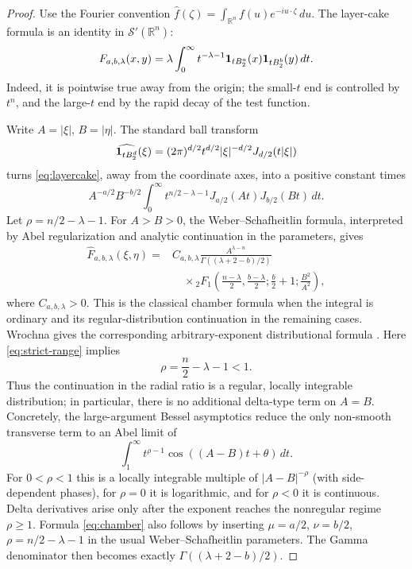 \documentclass[11pt]{article}
\theoremstyle{remark}
\newcommand{\R}{\mathbb R}
\newcommand{\Sclass}{\mathcal S}
\begin{document}
\begin{proof}
Use the Fourier convention
$\widehat f(\zeta)=\int_{\R^n}f(u)e^{-iu\cdot\zeta}\,du$.
The layer-cake formula is an identity in $\Sclass'(\R^n)$:
\begin{equation}\label{eq:layercake}
F_{a,b,\lambda}(x,y)=\lambda\int_0^\infty
t^{-\lambda-1}{\bf1}_{tB_2^a}(x){\bf1}_{tB_2^b}(y)\,dt.
\end{equation}
Indeed, it is pointwise true away from the origin; the small-$t$ end is
controlled by $t^n$, and the large-$t$ end by the rapid decay of the test
function.

Write $A=|\xi|$, $B=|\eta|$.  The standard ball transform
\[
\widehat{{\bf1}_{tB_2^d}}(\xi)
=(2\pi)^{d/2}t^{d/2}|\xi|^{-d/2}J_{d/2}(t|\xi|)
\]
turns \eqref{eq:layercake}, away from the coordinate axes, into a positive
constant times
\begin{equation}\label{eq:bessel}
A^{-a/2}B^{-b/2}\int_0^\infty
t^{n/2-\lambda-1}J_{a/2}(At)J_{b/2}(Bt)\,dt.
\end{equation}
Let $\rho=n/2-\lambda-1$.  For $A>B>0$, the
Weber--Schafheitlin formula, interpreted by Abel regularization and analytic
continuation in the parameters, gives
\begin{align}
\widehat F_{a,b,\lambda}(\xi,\eta)
={}&C_{a,b,\lambda}
\frac{A^{\lambda-n}}{\Gamma((\lambda+2-b)/2)} \label{eq:chamber}\\
&\quad\times{}_2F_1\left(
\frac{n-\lambda}{2},\frac{b-\lambda}{2};
\frac b2+1;\frac{B^2}{A^2}\right),\nonumber
\end{align}
where $C_{a,b,\lambda}>0$.  This is the classical chamber formula when
the integral is ordinary and its regular-distribution continuation in the
remaining cases.  Wrochna gives the corresponding arbitrary-exponent
distributional formula \cite{Wrochna}.  Here \eqref{eq:strict-range} implies
\[
\rho=\frac n2-\lambda-1<1.
\]
Thus the continuation in the radial ratio is a regular, locally integrable
distribution; in particular, there is no additional delta-type term on
$A=B$.  Concretely, the large-argument Bessel asymptotics reduce the only
non-smooth transverse term to an Abel limit of
\[
\int_1^\infty t^{\rho-1}\cos((A-B)t+\theta)\,dt.
\]
For $0<\rho<1$ this is a locally integrable multiple of
$|A-B|^{-\rho}$ (with side-dependent phases), for $\rho=0$ it is
logarithmic, and for $\rho<0$ it is continuous.  Delta derivatives arise
only after the exponent reaches the nonregular regime $\rho\geq1$.
Formula \eqref{eq:chamber} also follows by inserting
$\mu=a/2$, $\nu=b/2$, $\rho=n/2-\lambda-1$ in the usual
Weber--Schafheitlin parameters.  The Gamma denominator then becomes exactly
$\Gamma((\lambda+2-b)/2)$.


\end{proof}
\end{document}
